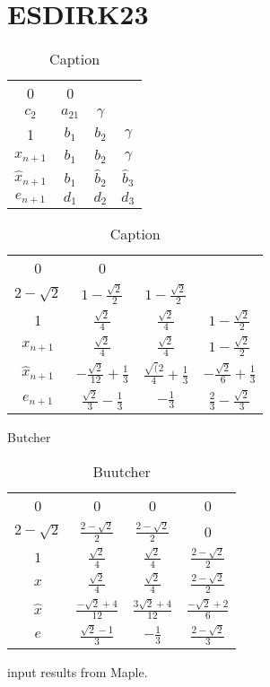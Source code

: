 \blankpage
\section{ESDIRK23}

\begin{table}[H]
    \centering
\begin{tabular}{c|ccc}
0 & 0 & & \\
$c_{2}$ & $a_{21}$ & $\gamma$ & \\
1 & $b_{1}$ & $b_{2}$ & $\gamma$ \\
\hline$x_{n+1}$ & $b_{1}$ & $b_{2}$ & $\gamma$ \\
$\hat{x}_{n+1}$ & $\hat{b}_{1}$ & $\hat{b}_{2}$ & $\hat{b}_{3}$ \\
\hline$e_{n+1}$ & $d_{1}$ & $d_{2}$ & $d_{3}$
\end{tabular}
    \caption{Caption}
    \label{tab:my_label}
\end{table}


\begin{table}[H]
    \centering
\begin{tabular}{c|ccc}
0 & 0 & & \\
$2 - \sqrt{2}$ & $1 - \frac{\sqrt{2}}{2}$ & $1 - \frac{\sqrt{2}}{2}$ & \\
1 & $\frac{\sqrt{2}}{4}$ & $\frac{\sqrt{2}}{4}$ & $1 - \frac{\sqrt{2}}{2}$ \\
\hline$x_{n+1}$ & $\frac{\sqrt{2}}{4}$ & $\frac{\sqrt{2}}{4}$ & $1 - \frac{\sqrt{2}}{2}$ \\
$\hat{x}_{n+1}$ & $-\frac{\sqrt{2}}{12} + \frac{1}{3}$ & $\frac{\sqrt(2}{4}+\frac{1}{3}$ & $-\frac{\sqrt{2}}{6} + \frac{1}{3}$ \\
\hline$e_{n+1}$ & $\frac{\sqrt{2}}{3} - \frac{1}{3}$ & $-\frac{1}{3}$ & $\frac{2}{3} - \frac{\sqrt{2}}{3}$
\end{tabular}
    \caption{Caption}
    \label{tab:my_label}
\end{table}




Butcher
\begin{table}[H]
\centering
\begin{tabular}{c|ccc}
0 & 0 & 0 & 0 \\
$2-\sqrt{2}$ & $\frac{2-\sqrt{2}}{2}$  & $\frac{2-\sqrt{2}}{2}$ & 0 \\
$1$ & $\frac{\sqrt{2}}{4}$ & $\frac{\sqrt{2}}{4}$ & $\frac{2-\sqrt{2}}{2}$ \\ \hline
$x$ & $\frac{\sqrt{2}}{4}$ & $\frac{\sqrt{2}}{4}$ & $\frac{2-\sqrt{2}}{2}$ \\
$\hat{x}$ & $\frac{-\sqrt{2}+4}{12}$ & $\frac{3\sqrt{2}+4}{12}$ & $\frac{-\sqrt{2}+2}{6} $ \\ \hline
$e$ & $\frac{\sqrt{2}-1}{3}$ & $-\frac{1}{3}$ & $\frac{2-\sqrt{2}}{3}$
\end{tabular}
\caption{Buutcher}
\end{table}

input results from Maple.